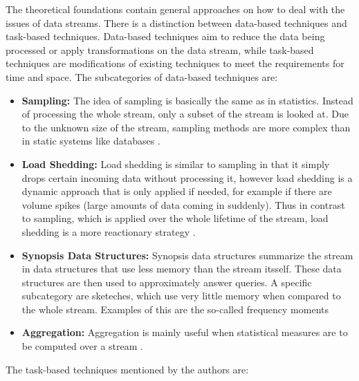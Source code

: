 The theoretical foundations contain general approaches on how to deal with the issues of data streams. There is a distinction between data-based techniques and task-based techniques. Data-based techniques aim to reduce the data being processed or apply transformations on the data stream, while task-based techniques are modifications of existing techniques to meet the requirements for time and space. The subcategories of data-based techniques are:

\begin{itemize}
	\item \textbf{Sampling:} The idea of sampling is basically the same as in statistics. Instead of processing the whole stream, only a subset of the stream is looked at. Due to the unknown size of the stream, sampling methods are more complex than in static systems like databases \cite{manku1999random}. 
	\item \textbf{Load Shedding:} Load shedding is similar to sampling in that it simply drops certain incoming data without processing it, however load shedding is a dynamic approach that is only applied if needed, for example if there are volume spikes (large amounts of data coming in suddenly). Thus in contrast to sampling, which is applied over the whole lifetime of the stream, load shedding is a more reactionary strategy \cite{babcock2003load}.
	\item \textbf{Synopsis Data Structures:} Synopsis data structures summarize the stream in data structures that use less memory than the stream itsself. These data structures are then used to approximately answer queries. A specific subcategory are sketeches, which use very little memory when compared to the whole stream. Examples of this are the so-called frequency moments \cite{babcock2002models}
	\item \textbf{Aggregation:} Aggregation is mainly useful when statistical measures are to be computed over a stream \cite{zhang2002temporal}.
\end{itemize}

The task-based techniques mentioned by the authors are:

